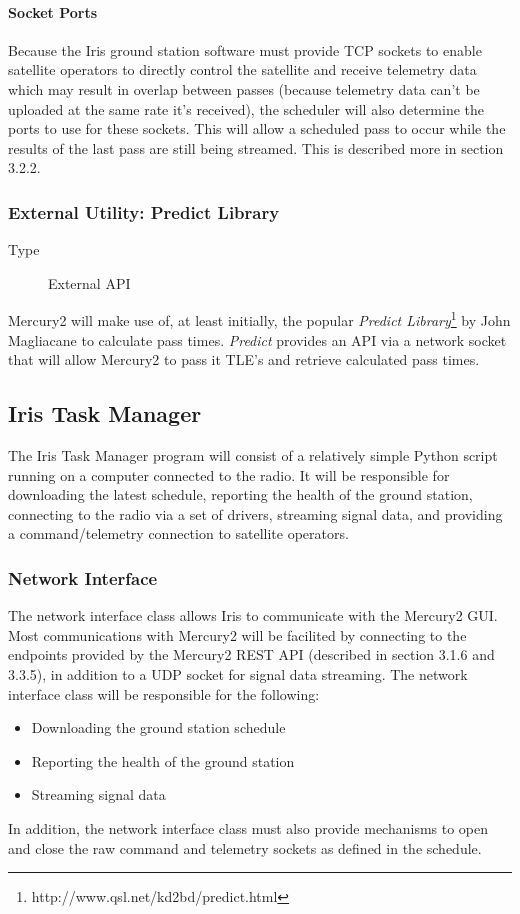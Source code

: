 \documentclass{mxl-note}
\begin{document}
\paragraph{Socket Ports}Because the Iris ground station software must provide TCP sockets to enable satellite operators to directly control the satellite and receive telemetry data which may result in overlap between passes (because telemetry data can't be uploaded at the same rate it's received), the scheduler will also determine the ports to use for these sockets. This will allow a scheduled pass to occur while the results of the last pass are still being streamed. This is described more in section 3.2.2.

\subsubsection{External Utility: Predict Library}
\begin{description}
	\item [Type]External API
\end{description} 
Mercury2 will make use of, at least initially, the popular \textit{Predict Library}\footnote{http://www.qsl.net/kd2bd/predict.html} by John Magliacane to calculate pass times. \textit{Predict} provides an API via a network socket that will allow Mercury2 to pass it TLE's and retrieve calculated pass times.

\subsection{Iris Task Manager}
The Iris Task Manager program will consist of a relatively simple Python script running on a computer connected to the radio. It will be responsible for downloading the latest schedule, reporting the health of the ground station, connecting to the radio via a set of drivers, streaming signal data, and providing a command/telemetry connection to satellite operators.

\subsubsection{Network Interface}
The network interface class allows Iris to communicate with the Mercury2 GUI. Most communications with Mercury2 will be facilited by connecting to the endpoints provided by the Mercury2 REST API (described in section 3.1.6 and 3.3.5), in addition to a UDP socket for signal data streaming. The network interface class will be responsible for the following:
\begin{itemize}
	\item Downloading the ground station schedule
	\item Reporting the health of the ground station
	\item Streaming signal data
\end{itemize}
In addition, the network interface class must also provide mechanisms to open and close the raw command and telemetry sockets as defined in the schedule.
\end{document}

